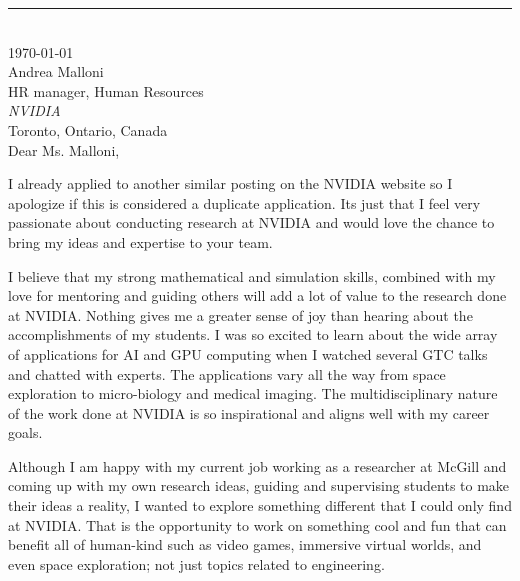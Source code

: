 \documentclass[12pt]{article} %
\begin{document}
\medskip %
\rule[0pt]{\textwidth}{1pt}\\
\today\\[6pt]
Andrea Malloni\\
HR manager, Human Resources\\
\textit{NVIDIA}\\
Toronto, Ontario, Canada\\[6pt] \medskip
Dear Ms. Malloni,

\medskip %
I already applied to another similar posting on the NVIDIA website so I apologize if this is considered a duplicate application. Its just that I feel very passionate about conducting research at NVIDIA and would love the chance to bring my ideas and expertise to your team.

\medskip %

I believe that my strong mathematical and simulation skills, combined with my love for mentoring and guiding others will add a lot of value to the research done at NVIDIA. Nothing gives me a greater sense of joy than hearing about the accomplishments of my students. I was so excited to learn about the wide array of applications for AI and GPU computing when I watched several GTC talks and chatted with experts. The applications vary all the way from space exploration to micro-biology and medical imaging. The multidisciplinary nature of the work done at NVIDIA is so inspirational and aligns well with my career goals.

\medskip %

Although I am happy with my current job working as a researcher at McGill and coming up with my own research ideas, guiding and supervising students to make their ideas a reality, I wanted to explore something different that I could only find at NVIDIA. That is the opportunity to work on something cool and fun that can benefit all of human-kind such as video games, immersive virtual worlds, and even space exploration; not just topics related to engineering. 
\end{document}
